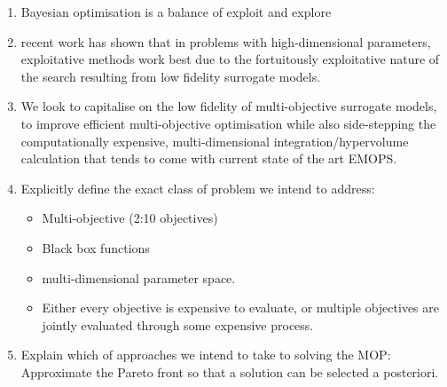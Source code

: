 \documentclass[runningheads]{llncs}
\begin{document}
\begin{enumerate}
    \item Bayesian optimisation is a balance of exploit and explore
    \item recent work has shown that in problems with high-dimensional parameters, exploitative methods work best due to the fortuitously exploitative nature of the search resulting from low fidelity surrogate models. 
    \item We look to capitalise on the low fidelity of multi-objective surrogate models, to improve efficient multi-objective optimisation while also side-stepping the computationally expensive, multi-dimensional integration/hypervolume calculation that tends to come with current state of the art EMOPS. 
    \item Explicitly define the exact class of problem we intend to address:
    \begin{itemize}
        \item Multi-objective (2:10 objectives)
        \item Black box functions
        \item multi-dimensional parameter space.
        \item Either every objective is expensive to evaluate, or multiple objectives are jointly evaluated through some expensive process.
    \end{itemize}
    \item Explain which of \cite{hwang2012multiple} approaches we intend to take to solving the MOP: Approximate the Pareto front so that a solution can be selected a posteriori.
\end{enumerate}
\end{document}
